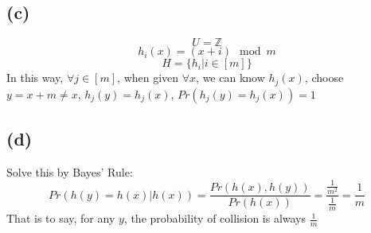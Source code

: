 \documentclass{article}
\begin{document}
  \subsection*{(c)}
    $$ U = \mathbb{Z}$$
    $$h_i(x) = (x+i) \mod m$$
    $$H = \{h_i | i \in [m]\}$$
    In this way, $\forall j \in [m]$, when given  $\forall x$, we can know $h_j(x)$, choose $y = x + m \neq x$, $h_j(y) = h_j(x)$, $Pr(h_j(y) = h_j(x)) = 1$

  \subsection*{(d)}
    Solve this by Bayes' Rule:
    $$Pr(h(y) = h(x) | h(x)) = \frac{Pr(h(x), h(y))}{Pr(h(x))} = \frac{\frac{1}{m^2}}{\frac{1}{m}} = \frac{1}{m}$$
    That is to say, for any $y$, the probability of collision is always $\frac{1}{m}$
\end{document}
